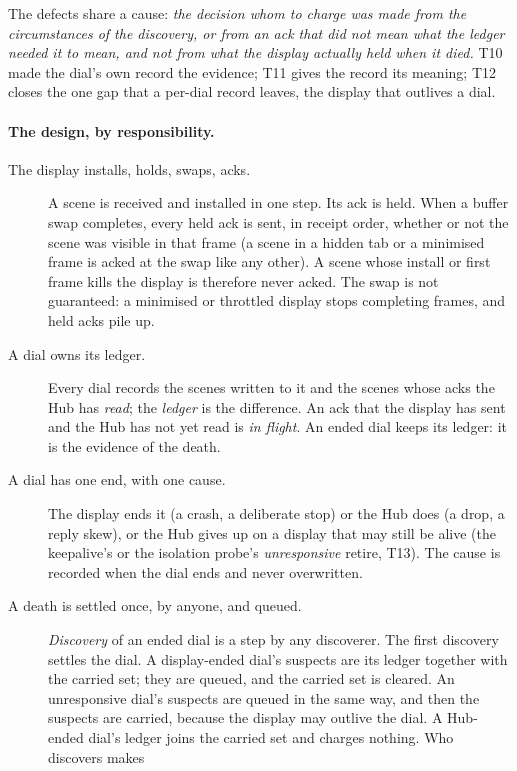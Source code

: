 \documentclass[a4paper,10pt,fleqn]{article}
\begin{document}
The defects share a cause: \emph{the decision whom to charge was made from the
circumstances of the discovery, or from an ack that did not mean what the ledger
needed it to mean, and not from what the display actually held when it died.}
T10 made the dial's own record the evidence; T11 gives the record its meaning;
T12 closes the one gap that a per-dial record leaves, the display that outlives
a dial.

\paragraph{The design, by responsibility.}
\begin{description}
  \item[The display installs, holds, swaps, acks.]  A scene is received and
    installed in one step.  Its ack is held.  When a buffer swap completes,
    every held ack is sent, in receipt order, whether or not the scene was
    visible in that frame (a scene in a hidden tab or a minimised frame is
    acked at the swap like any other).  A scene whose install or first frame
    kills the display is therefore never acked.  The swap is not guaranteed: a
    minimised or throttled display stops completing frames, and held acks pile up.
  \item[A dial owns its ledger.]  Every dial records the scenes written to it and
    the scenes whose acks the Hub has \emph{read}; the \emph{ledger} is the
    difference.  An ack that the display has sent and the Hub has not yet read is
    \emph{in flight}.  An ended dial keeps its ledger: it is the evidence of the
    death.
  \item[A dial has one end, with one cause.]  The display ends it (a crash, a
    deliberate stop) or the Hub does (a drop, a reply skew), or the Hub gives up on a display
    that may still be alive (the keepalive's or the isolation probe's
    \emph{unresponsive} retire, T13).  The cause is recorded when the dial ends
    and never overwritten.
  \item[A death is settled once, by anyone, and queued.]  \emph{Discovery} of an
    ended dial is a step by any discoverer.  The first discovery settles the
    dial.  A display-ended dial's suspects are its ledger together with the
    carried set; they are queued, and the carried set is cleared.  An
    unresponsive dial's suspects are queued in the same way, and then the
    suspects are carried, because the display may outlive the dial.  A Hub-ended
    dial's ledger joins the carried set and charges nothing.  Who discovers makes

\end{description}
\end{document}
